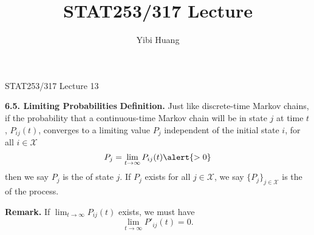 \documentclass[letterpaper,handout]{beamer}
\title{STAT253/317 Lecture \chapnum} \date{} \author{Yibi Huang}
\def\X{\mathcal{X}}
\def\typo#1{\alert{#1}}
\def\chapnum{13}
\begin{document}
%
\begin{frame}{STAT253/317 Lecture \chapnum}
\begin{block}{\bf 6.5. Limiting Probabilities}
\textbf{Definition.} Just like discrete-time Markov chains, if the probability that
a continuous-time Markov chain will be in state $j$ at time $t$, $P_{ij}(t)$, converges to
a limiting value $P_j$ independent of the initial state $i$, for all $i\in\X$
$$
P_j = \lim_{t\to\infty}P_{ij}(t) \typo{>0}
$$
then we say $P_j$ is the  of state $j$.
If $P_j$ exists for all $j\in\X$, we say $\{P_j\}_{j\in\X}$ is the  of the process.

\bigskip

\textbf{Remark.}
If $\lim_{t\to\infty}P_{ij}(t)$ exists, we must have
$$\lim_{t\to\infty}P'_{ij}(t)=0.$$
\end{block}
\end{frame}
\end{document}
